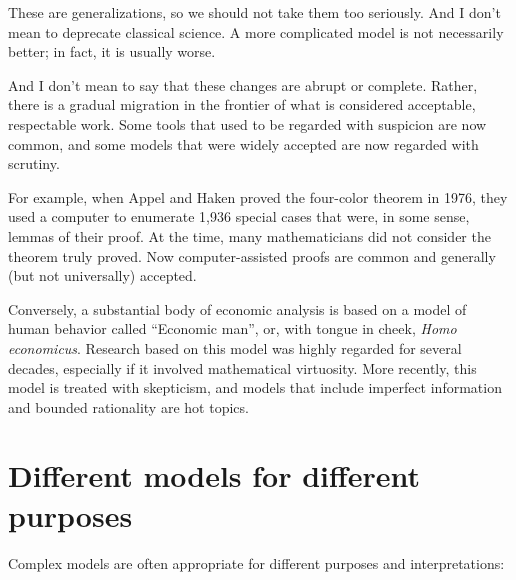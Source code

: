 \documentclass[12pt]{book}
\theoremstyle{exercise}
\begin{document}
These are generalizations, so we should not take them too seriously.
And I don't mean to deprecate classical science.  A more complicated
model is not necessarily better; in fact, it is usually worse.

And I don't mean to say that these changes are abrupt or complete.
Rather, there is a gradual migration in the frontier of what is
considered acceptable, respectable work.  Some tools that used to be
regarded with suspicion are now common, and some models that were
widely accepted are now regarded with scrutiny.

For example, when Appel and Haken proved the four-color theorem in
1976, they used a computer to enumerate 1,936 special cases that were,
in some sense, lemmas of their proof.  At the time, many
mathematicians did not consider the theorem truly proved.  Now
computer-assisted proofs are common and generally (but not
universally) accepted.


Conversely, a substantial body of economic analysis is based on a
model of human behavior called ``Economic man'', or, with tongue in
cheek, {\it Homo economicus}.  Research based on this model was
highly regarded for several decades, especially if it involved
mathematical virtuosity.  More recently, this model is treated with
skepticism, and models that include imperfect information and
bounded rationality are hot topics.



\section{Different models for different purposes}

Complex models are often appropriate for different purposes and
interpretations:

\end{document}
